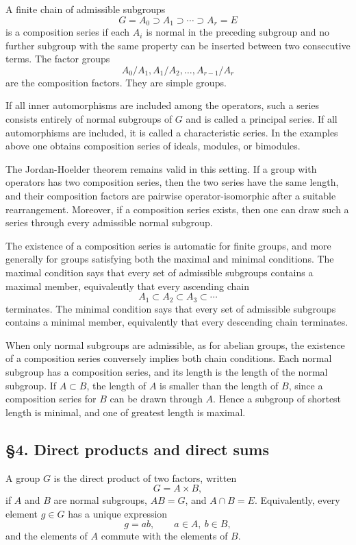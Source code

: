 \documentclass[
  12pt,
]{article}
\begin{document}
A finite chain of admissible subgroups \[
  G=A_0\supset A_1\supset\cdots\supset A_r=E
\] is a composition series if each \(A_i\) is normal in the preceding
subgroup and no further subgroup with the same property can be inserted
between two consecutive terms. The factor groups \[
  A_0/A_1,
  A_1/A_2,
  \ldots,
  A_{r-1}/A_r
\] are the composition factors. They are simple groups.

If all inner automorphisms are included among the operators, such a
series consists entirely of normal subgroups of \(G\) and is called a
principal series. If all automorphisms are included, it is called a
characteristic series. In the examples above one obtains composition
series of ideals, modules, or bimodules.

The Jordan-Hoelder theorem remains valid in this setting. If a group
with operators has two composition series, then the two series have the
same length, and their composition factors are pairwise
operator-isomorphic after a suitable rearrangement. Moreover, if a
composition series exists, then one can draw such a series through every
admissible normal subgroup.

The existence of a composition series is automatic for finite groups,
and more generally for groups satisfying both the maximal and minimal
conditions. The maximal condition says that every set of admissible
subgroups contains a maximal member, equivalently that every ascending
chain \[
  A_1\subset A_2\subset A_3\subset\cdots
\] terminates. The minimal condition says that every set of admissible
subgroups contains a minimal member, equivalently that every descending
chain terminates.

When only normal subgroups are admissible, as for abelian groups, the
existence of a composition series conversely implies both chain
conditions. Each normal subgroup has a composition series, and its
length is the length of the normal subgroup. If \(A\subset B\), the
length of \(A\) is smaller than the length of \(B\), since a composition
series for \(B\) can be drawn through \(A\). Hence a subgroup of
shortest length is minimal, and one of greatest length is maximal.

\subsection{§4. Direct products and direct
sums}\label{direct-products-and-direct-sums}

A group \(G\) is the direct product of two factors, written \[
  G=A\times B,
\] if \(A\) and \(B\) are normal subgroups, \(AB=G\), and \(A\cap B=E\).
Equivalently, every element \(g\in G\) has a unique expression \[
  g=ab,
  \qquad a\in A,\ b\in B,
\] and the elements of \(A\) commute with the elements of \(B\).
\end{document}
